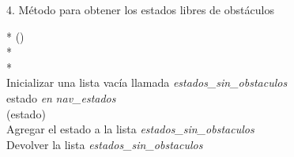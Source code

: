 \documentclass[conference,a4paper]{IEEEtran}
\begin{document}
4. Método para obtener los estados libres de obstáculos
  \begin{pseudo}*
    () \\*
     \\*
    \\
    Inicializar una lista vacía llamada \textit{estados\_sin\_obstaculos} \\
     estado \textit{en} \textit{nav\_estados}  \\
    \>  (estado)  \\
    \> \> Agregar el estado a la lista \textit{estados\_sin\_obstaculos} \\
    Devolver la lista \textit{estados\_sin\_obstaculos}
  \end{pseudo}
\end{document}
